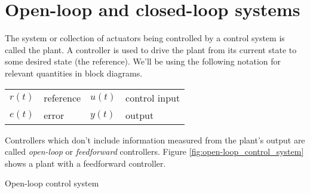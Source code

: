 \section{Open-loop and closed-loop systems}

The \gls{system} or collection of actuators being controlled by a
\gls{control system} is called the \gls{plant}. A \gls{controller} is used to
drive the plant from its current state to some desired state (the
\gls{reference}). We'll be using the following notation for relevant quantities
in block diagrams.
\begin{figurekey}
  \begin{tabular}{llll}
    $r(t)$ & \gls{reference} & $u(t)$ & \gls{control input} \\
    $e(t)$ & \gls{error} & $y(t)$ & \gls{output} \\
  \end{tabular}
\end{figurekey}

Controllers which don't include information measured from the plant's
\gls{output} are called \textit{open-loop} or \textit{feedforward} controllers.
Figure \ref{fig:open-loop_control_system} shows a plant with a feedforward
controller.
\begin{bookfigure}

  \caption{Open-loop control system}
  \label{fig:open-loop_control_system}
\end{bookfigure}

